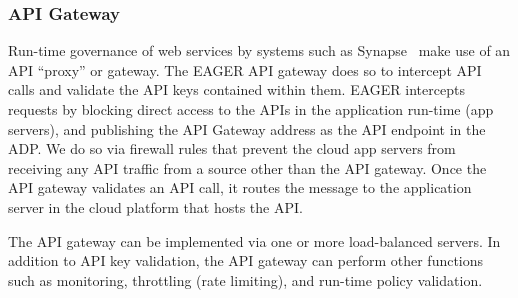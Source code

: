 \subsubsection{API Gateway} 
Run-time governance of web services by systems such as
Synapse~\cite{synapse} make use of an API ``proxy'' or gateway.
The EAGER API gateway does so to intercept API calls and validate 
the API keys contained within them.
EAGER intercepts requests by blocking direct access to the APIs in the
application run-time (app servers), and publishing the API Gateway address as
the API endpoint in the ADP. We do so via firewall rules
that prevent the cloud app servers from receiving any
API traffic from a source other than the API gateway. Once the API gateway validates
an API call, it routes the message to the
application server in the cloud platform that hosts the API.

The API gateway can be implemented via one or more load-balanced servers.
In addition to API key validation, the API gateway can perform other
functions such as monitoring, throttling (rate limiting), 
and run-time policy validation. 
